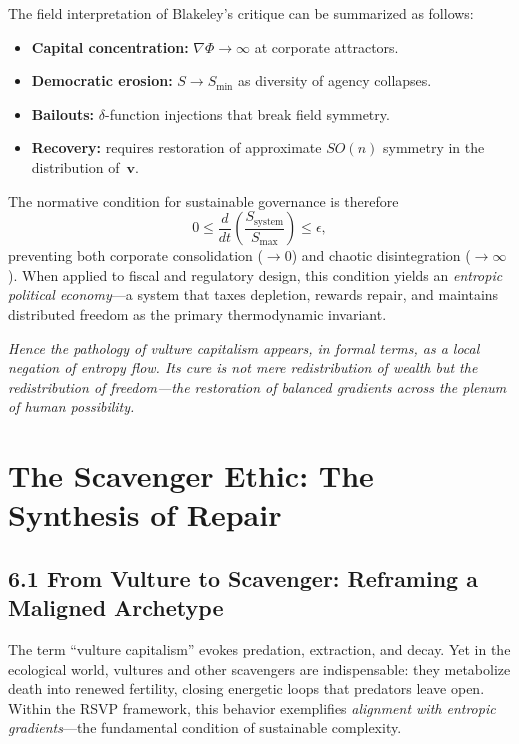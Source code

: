 \documentclass[11pt,a4paper,titlepage]{article}
\theoremstyle{definition}
\begin{document}
The field interpretation of Blakeley’s critique can be summarized as follows:
\begin{itemize}[nosep]
  \item \textbf{Capital concentration:}
        $\nabla\Phi \!\to\! \infty$ at corporate attractors.
  \item \textbf{Democratic erosion:}
        $S \!\to\! S_{\min}$ as diversity of agency collapses.
  \item \textbf{Bailouts:}
        $\delta$-function injections that break field symmetry.
  \item \textbf{Recovery:}
        requires restoration of approximate $SO(n)$ symmetry in the
        distribution of~$\mathbf{v}$.
\end{itemize}

The normative condition for sustainable governance is therefore
\begin{equation}
0 \le
   \frac{d}{dt}\!\left(\frac{S_{\text{system}}}{S_{\max}}\right)
 \le \epsilon,
\label{eq:governance_condition}
\end{equation}
preventing both corporate consolidation ($\!\to\!0$) and chaotic disintegration
($\!\to\!\infty$).
When applied to fiscal and regulatory design, this condition yields an
\emph{entropic political economy}—a system that taxes depletion, rewards
repair, and maintains distributed freedom as the primary thermodynamic
invariant.

\bigskip
\noindent
\textit{Hence the pathology of vulture capitalism appears, in formal terms, as
a local negation of entropy flow.
Its cure is not mere redistribution of wealth but the redistribution of
freedom—the restoration of balanced gradients across the plenum of human
possibility.}

\section{The Scavenger Ethic: The Synthesis of Repair}
\label{sec:scavenger}

\subsection{6.1 From Vulture to Scavenger: Reframing a Maligned Archetype}

The term “vulture capitalism” evokes predation, extraction, and decay.  
Yet in the ecological world, vultures and other scavengers are indispensable:  
they metabolize death into renewed fertility, closing energetic loops that 
predators leave open.  
Within the RSVP framework, this behavior exemplifies 
\emph{alignment with entropic gradients}—the fundamental condition of 
sustainable complexity.  
\end{document}
